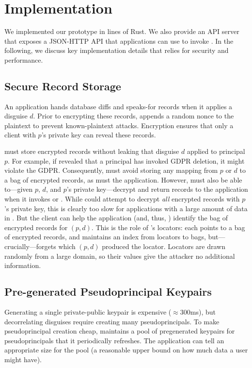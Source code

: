 \section{Implementation}

%
We implemented our \sys prototype in  lines of Rust.
%
We also provide an API server that exposes a JSON-HTTP API that applications
can use to invoke \sys.
%
In the following, we discuss key implementation details that \sys relies for
security and performance.
%

\subsection{Secure Record Storage}
%
An application hands \sys database diffs and speaks-for records when it applies
a disguise $d$.
%
Prior to encrypting these records, \sys appends a random nonce to the plaintext
to prevent known-plaintext attacks.
%
Encryption ensures that only a client with $p$'s private key can reveal these
records.
%

%
\sys must store encrypted records without leaking that disguise $d$ applied to
principal $p$.
%
For example, if \sys revealed that a principal has invoked GDPR deletion, it
might violate the GDPR.
%
Consequently, \sys must avoid storing any mapping from $p$ or $d$ to a bag of
encrypted records, as must the application.
%
However, \sys must also be able to---given $p$, $d$, and $p$'s private
key---decrypt and return records to the application when it invokes
 or .
%
While \sys could attempt to decrypt \emph{all} encrypted records with $p$'s
private key, this is clearly too slow for applications with a large amount
of data in \sys.
%
But the client can help the application (and, thus, \sys) identify the bag
of encrypted records for $(p, d)$.
%
This is the role of \sys's locators: each  points to a bag of
encrypted records, and \sys maintains an index from locators to bags,
but---crucially---forgets which $(p, d)$ produced the locator.
%
Locators are drawn randomly from a large domain, so their values give
the attacker no additional information.
%

\subsection{Pre-generated Pseudoprincipal Keypairs}
%
Generating a single private-public keypair is expensive ($\approx$300ms), but
decorrelating disguises require creating many pseudoprincipals.
%
To make pseudoprincipal creation cheap, \sys maintains a pool of
pregenerated keypairs for pseudoprincipals that it periodically refreshes.
%
The application can tell \sys an appropriate size for the pool (\eg a reasonable
upper bound on how much data a user might have).
%
%

